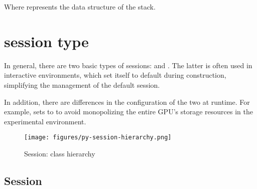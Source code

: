 \begin{content}
\begin{content}

Where  represents the data structure of the stack.


\end{content}

\section{session type}

\begin{content}

In general, there are two basic types of sessions:  and . The latter is often used in interactive environments, which set itself to default during construction, simplifying the management of the default session.

In addition, there are differences in the configuration of the two at runtime. For example,  sets  to  to avoid monopolizing the entire GPU's storage resources in the experimental environment.

\begin{figure}[!htbp]
\centering
\texttt{[image: figures/py-session-hierarchy.png]}
\caption{Session: class hierarchy}
 \label{fig:py-session-hierarchy}
\end{figure}

\subsection{Session}


\end{content}
\end{content}
